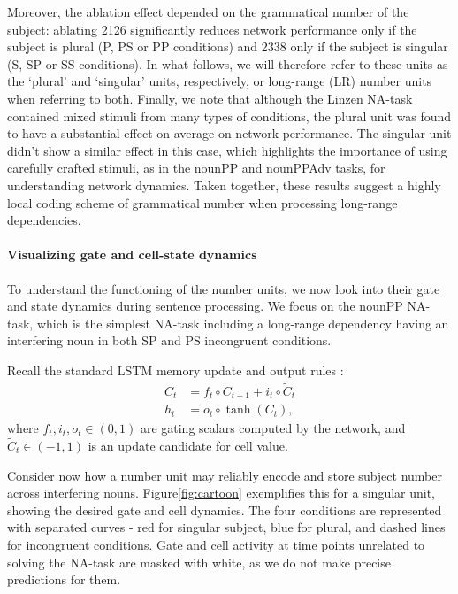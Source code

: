 Moreover, the ablation effect depended on the grammatical number of the subject: ablating \unit{2}{126} significantly reduces
network performance only if the subject is plural (P, PS or PP conditions) and \unit{2}{338}
only if the subject is singular (S, SP or SS conditions). In what follows, we will therefore
refer to these units as the `plural' and `singular' units, respectively,
or long-range (LR) number units when referring to both. Finally, we note that although the Linzen NA-task contained mixed stimuli from many types of conditions, the plural unit was found to have a substantial effect on average on network performance. The singular unit didn't show a similar effect in this case, which highlights the importance of using carefully crafted stimuli, as in the nounPP and nounPPAdv tasks, for understanding network dynamics. Taken
together, these results suggest a highly local coding scheme of
grammatical number when processing long-range dependencies.

\paragraph{Visualizing gate and cell-state dynamics}\label{subsec:gate-dynamics}
To understand the functioning of the number units, we now look
into their gate and state dynamics during sentence processing. We
focus on the nounPP NA-task, which is the simplest NA-task including a
long-range dependency having an interfering noun in both SP and PS
incongruent conditions.

Recall the standard LSTM memory update and output rules \cite{Hochreiter:Schmidhuber:1997}:
\begin{align} 
    C_t &= f_t\circ C_{t-1} + i_t\circ \widetilde{C}_t \label{eq:update-rule} \\
     h_t &= o_t\circ \tanh(C_t) \label{eq:output},
\end{align}
where $f_t, i_t, o_t \in (0,1)$ are gating scalars computed by the network, and $\widetilde{C}_t \in (-1, 1)$ is an update candidate for cell value.

Consider now how a number unit may reliably encode and store subject
number across interfering nouns.  Figure\ref{fig:cartoon} exemplifies
this for a singular unit, showing the desired gate and cell
dynamics. The four conditions are represented with separated curves -
red for singular subject, blue for plural, and dashed lines for
incongruent conditions. Gate and cell activity at time points
unrelated to solving the NA-task are masked with white, as we do not
make precise predictions for them.

